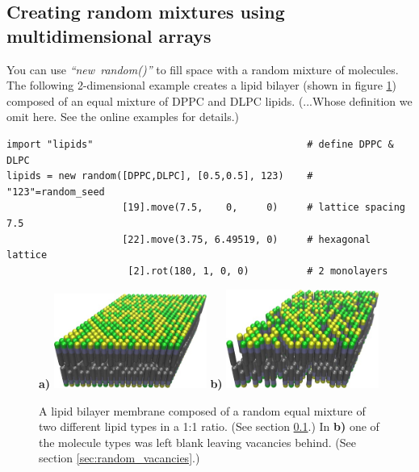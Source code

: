 \documentclass[11pt]{article}
\begin{document}
\subsection{Creating random mixtures using multidimensional arrays}
\label{sec:random_advanced}
You can use \mbox{\textit{``new random()''}} to fill space with
a random mixture of molecules.  The following 2-dimensional example
creates a lipid bilayer (shown in figure \ref{fig:random_bilayer})
composed of an equal mixture of 
DPPC and DLPC lipids. (...Whose definition we omit here.  
See the online examples for details.)
\begin{verbatim}
import "lipids"                                     # define DPPC & DLPC
lipids = new random([DPPC,DLPC], [0.5,0.5], 123)    # "123"=random_seed
                    [19].move(7.5,    0,     0)     # lattice spacing 7.5
                    [22].move(3.75, 6.49519, 0)     # hexagonal lattice
                     [2].rot(180, 1, 0, 0)          # 2 monolayers
\end{verbatim}
\begin{figure}[htbp]
\centering
\textbf{a)}
\includegraphics[width=5cm]{lipid_bilayer_mixture.jpg}
\hspace{0.5cm}
\textbf{b)}
\includegraphics[width=5cm]{lipid_bilayer_vacancies.jpg}
\caption{
\label{fig:random_bilayer}
A lipid bilayer membrane composed of a random equal mixture of
two different lipid types in a 1:1 ratio.
(See section \ref{sec:random_advanced}.)
In \textbf{b)} one of the molecule types was left blank
leaving vacancies behind.  
(See section \ref{sec:random_vacancies}.)
}
\end{figure}
\end{document}
